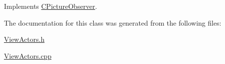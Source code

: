 Implements \hyperlink{class_c_picture_observer_a0dce27216a8cb8a2490f0efc83a5994a}{C\+Picture\+Observer}.



The documentation for this class was generated from the following files\+:\begin{DoxyCompactItemize}
\item 
\hyperlink{_view_actors_8h}{View\+Actors.\+h}\item 
\hyperlink{_view_actors_8cpp}{View\+Actors.\+cpp}\end{DoxyCompactItemize}
